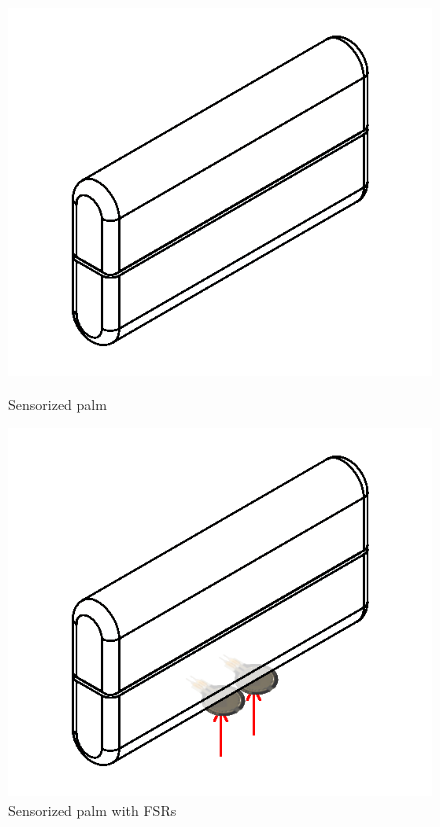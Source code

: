 \begin{figure}[h]
  \centering
  \begin{minipage}[b]{0.4\textwidth}
    \includegraphics[width=\textwidth]{Figure/dummipalm.png}
    \caption{Sensorized palm}
  \label{fig:dummi}
  \end{minipage}
  \hfill
  \begin{minipage}[b]{0.4\textwidth}
    \includegraphics[width=\textwidth]{Figure/dummipalmside.png}
    \caption{Sensorized palm with FSRs}
    \label{fig:dummifsr}
  \end{minipage}
\end{figure}

